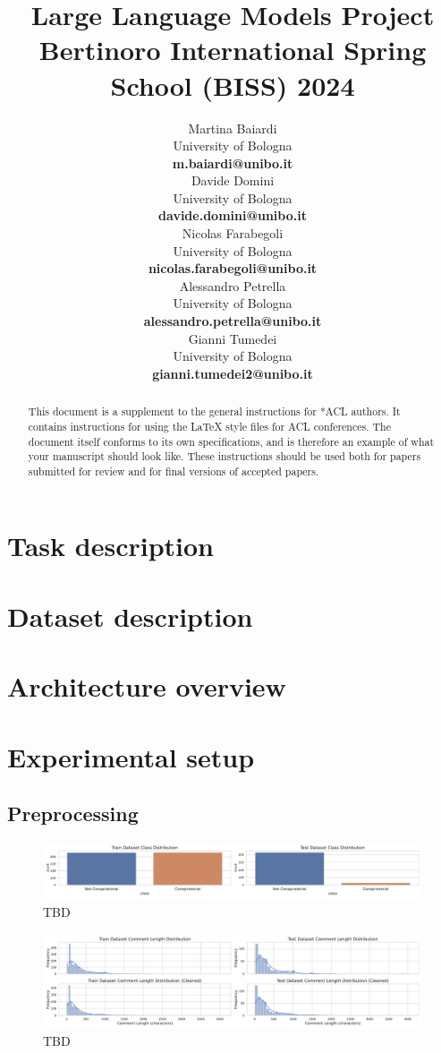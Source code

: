 \documentclass[11pt]{article}
\title{Large Language Models Project \\
Bertinoro International Spring School (BISS) 2024}
\author{
  Martina Baiardi \\
  University of Bologna \\
  {\bf m.baiardi@unibo.it} \\ \And
  Davide Domini \\
  University of Bologna \\
  {\bf davide.domini@unibo.it} \\  \And
  Nicolas Farabegoli \\
  University of Bologna \\
  {\bf nicolas.farabegoli@unibo.it} \\  \AND 
  Alessandro Petrella\\
  University of Bologna \\ 
  {\bf alessandro.petrella@unibo.it} \\ \And 
  Gianni Tumedei \\
  University of Bologna \\
  {\bf gianni.tumedei2@unibo.it}
}
\begin{document}
\maketitle
\begin{abstract}
This document is a supplement to the general instructions for *ACL authors. It contains instructions for using the \LaTeX{} style files for ACL conferences.
The document itself conforms to its own specifications, and is therefore an example of what your manuscript should look like.
These instructions should be used both for papers submitted for review and for final versions of accepted papers.
\end{abstract}

\section{Task description}\label{sec:task-description}

\section{Dataset description}\label{sec:dataset-description}

\section{Architecture overview}\label{sec:architecture-overview}

\section{Experimental setup}\label{sec:experimental-setup}

\subsection{Preprocessing}\label{sec:preprocessing}
\begin{figure}
  \centering
  \includegraphics[width=\textwidth]{figures/class_distribution.pdf}
  \caption{TBD}
  \label{fig:class-frequency}
\end{figure}

\begin{figure}
  \centering
  \includegraphics[width=\textwidth]{figures/comment_length_distribution.pdf}
  \caption{TBD}
  \label{fig:words-distribution}
\end{figure}
\end{document}
